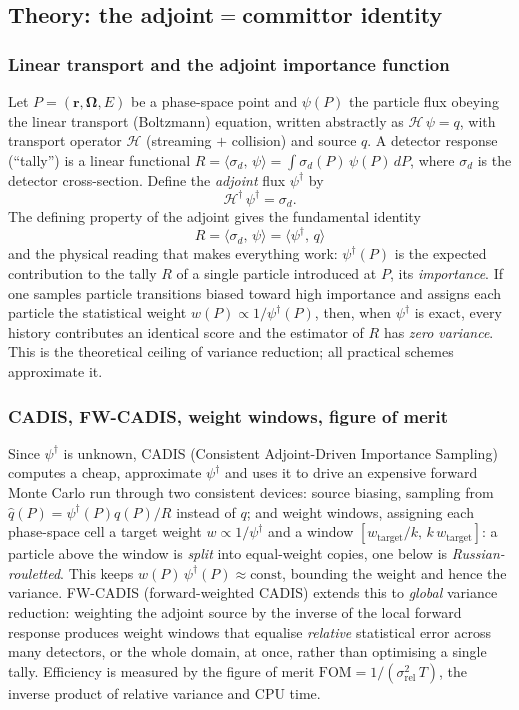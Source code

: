 \documentclass[a4paper,fleqn]{cas-sc}
\newcommand{\dg}{^{\dagger}}
\newcommand{\ip}[2]{\langle #1,\,#2\rangle}
\begin{document}
\subsection{Theory: the adjoint$=$committor identity}\label{sec:theory}

\subsubsection{Linear transport and the adjoint importance function}
Let $P=(\mathbf r,\mathbf\Omega,E)$ be a phase-space point and $\psi(P)$ the particle flux
obeying the linear transport (Boltzmann) equation, written abstractly as $\mathcal H\,\psi
= q$, with transport operator $\mathcal H$ (streaming $+$ collision) and source $q$. A
detector response (``tally'') is a linear functional $R=\ip{\sigma_d}{\psi}=\int
\sigma_d(P)\,\psi(P)\,dP$, where $\sigma_d$ is the detector cross-section. Define the
\emph{adjoint} flux $\psi\dg$ by
\begin{equation}
	\mathcal H\dg\,\psi\dg=\sigma_d .
	\label{eq:adjoint}
\end{equation}
The defining property of the adjoint gives the fundamental identity
\begin{equation}
	\boxed{\;R=\ip{\sigma_d}{\psi}=\ip{\psi\dg}{q}\;}
	\label{eq:fund}
\end{equation}
and the physical reading that makes everything work: $\psi\dg(P)$ is the expected
contribution to the tally $R$ of a single particle introduced at $P$, its
\emph{importance}. If one samples particle transitions biased toward high importance and
assigns each particle the statistical weight $w(P)\propto 1/\psi\dg(P)$, then, when
$\psi\dg$ is exact, every history contributes an identical score and the estimator of $R$
has \emph{zero variance}. This is the theoretical ceiling of variance reduction; all
practical schemes approximate it.

\subsubsection{CADIS, FW-CADIS, weight windows, figure of merit}
Since $\psi\dg$ is unknown, CADIS (Consistent Adjoint-Driven Importance Sampling) computes
a cheap, approximate $\psi\dg$ and uses it to drive an expensive forward Monte Carlo run
through two consistent devices: source biasing, sampling from
$\hat q(P)=\psi\dg(P)q(P)/R$ instead of $q$; and weight windows, assigning each
phase-space cell a target weight $w\propto 1/\psi\dg$ and a window
$[w_{\text{target}}/k,\,k\,w_{\text{target}}]$: a particle above the window is
\emph{split} into equal-weight copies, one below is \emph{Russian-rouletted}. This keeps
$w(P)\,\psi\dg(P)\approx\text{const}$, bounding the weight and hence the variance.
FW-CADIS (forward-weighted CADIS) extends this to \emph{global} variance
reduction: weighting the adjoint source by the inverse of the local forward response
produces weight windows that equalise \emph{relative} statistical error across many
detectors, or the whole domain, at once, rather than optimising a single tally. Efficiency
is measured by the figure of merit $\mathrm{FOM}=1/(\sigma_{\mathrm{rel}}^2\,T)$, the
inverse product of relative variance and CPU time.
\end{document}
